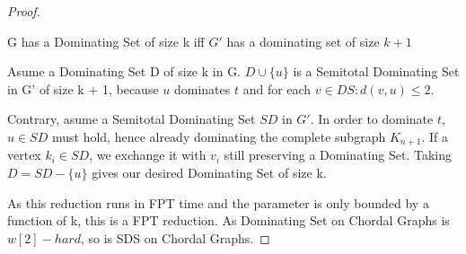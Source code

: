\begin{proof}
    \begin{corollary}
    G has a Dominating Set of size k iff $G'$ has a dominating set of size $k+1$
    \end{corollary}
    \begin{subproof}
    Asume a Dominating Set D of size k in G. $D \cup \{u\}$ is a Semitotal Dominating Set in G' of size k + 1, because $u$ dominates $t$ and for each $v \in DS: d(v, u) \leq 2$.

    Contrary, asume a Semitotal Dominating Set $SD$ in $G'$. In order to dominate $t$, $u \in SD$ must hold, hence already dominating the complete subgraph $K_{n+1}$. If a vertex $k_i \in SD$, we exchange it with $v_i$ still preserving a Dominating Set. Taking $D = SD - \{ u \}$ gives our desired Dominating Set of size k.
    \end{subproof}
    As this reduction runs in FPT time and the parameter is only bounded by a function of k, this is a FPT reduction. As Dominating Set on Chordal Graphs is $w[2]-hard$, so is SDS on Chordal Graphs.

\end{proof}
